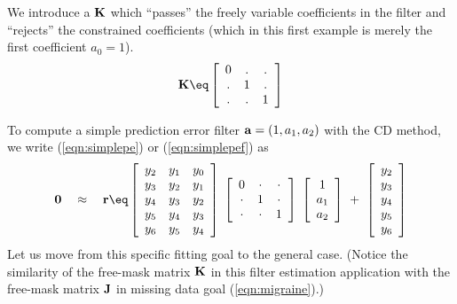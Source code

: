 \par
We introduce a
 $\bold K$
which ``passes'' the freely variable coefficients in the filter
and ``rejects'' the constrained coefficients
(which in this first example is merely the first coefficient $a_0=1$).
\begin{equation}
\bold K \eq
\left[
\begin{array}{cccccc}
  0   & .   & .    \\
  .   & 1   & .    \\
  .   & .   & 1    
  \end{array} \right]
\label{eqn:pefconstraint}
\end{equation}
\par
To compute a simple prediction error filter $\bold a =(1, a_1, a_2)$
with the CD method,
we write
(\ref{eqn:simplepe}) or
(\ref{eqn:simplepef}) as
\begin{equation}
\bold 0
\quad \approx \quad
\bold r \eq
\left[ 
\begin{array}{ccc}
  y_2 & y_1 & y_0 \\
  y_3 & y_2 & y_1  \\
  y_4 & y_3 & y_2  \\
  y_5 & y_4 & y_3  \\
  y_6 & y_5 & y_4  \end{array} \right] 
\;
\left[ 
\begin{array}{ccc}
    0   & \cdot & \cdot \\
  \cdot &   1   & \cdot \\
  \cdot & \cdot &   1   
  \end{array} \right] 
\;
\left[ 
\begin{array}{c}
  1 \\ 
  a_1 \\ 
  a_2 \end{array} \right]
  \ +\ 
\left[ 
\begin{array}{c}
  y_2 \\ 
  y_3 \\ 
  y_4 \\ 
  y_5 \\ 
  y_6 \end{array} \right] 
  \label{eqn:stdpef}
\end{equation}
Let us move from this specific fitting goal to the general case.
(Notice the similarity of the free-mask matrix $\bold K$
in this filter estimation application with the
free-mask matrix $\bold J$ in missing data goal (\ref{eqn:migraine}).)
